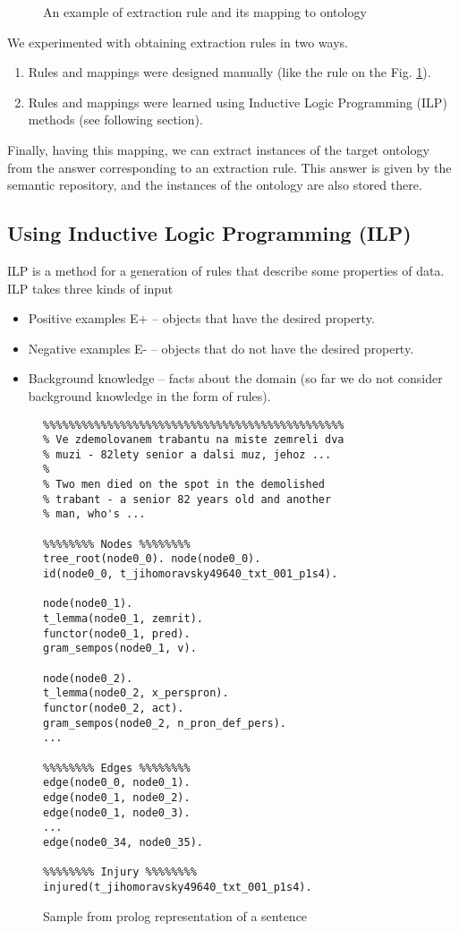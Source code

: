 \documentclass{sig-alternate}
\begin{document}
\begin{figure}
\centering
{}
\caption{An example of extraction rule and its mapping to ontology}
\label{img:ExtractionOntology}
\end{figure}

We experimented with obtaining extraction rules in two ways.
\begin{enumerate}
\item Rules and mappings were designed manually (like the rule on the Fig. \ref{img:ExtractionOntology}). 
\item Rules and mappings were learned using Inductive Logic Programming (ILP) methods (see following section).
\end{enumerate}
 Finally, having this mapping, we can extract instances of the target ontology from the answer corresponding to an extraction rule. This answer is given by the semantic repository, and the instances of the ontology are also stored there.

\subsection{Using Inductive Logic Programming (ILP)}
ILP \cite{biblio:Muggleton} is a method for a generation of rules that describe some properties of data. ILP takes three kinds of input
\begin{itemize}
	\item Positive examples E+ -- objects that have the desired property.
	\item Negative examples E- -- objects that do not have the desired property.
	\item Background knowledge -- facts about the domain (so far we do not consider background knowledge in the form of rules).
\end{itemize}

\begin{figure}
{\footnotesize\begin{verbatim}
%%%%%%%%%%%%%%%%%%%%%%%%%%%%%%%%%%%%%%%%%%%%%%%
% Ve zdemolovanem trabantu na miste zemreli dva
% muzi - 82lety senior a dalsi muz, jehoz ...
%
% Two men died on the spot in the demolished 
% trabant - a senior 82 years old and another 
% man, who's ...

%%%%%%%% Nodes %%%%%%%%
tree_root(node0_0). node(node0_0). 
id(node0_0, t_jihomoravsky49640_txt_001_p1s4).

node(node0_1).
t_lemma(node0_1, zemrit).
functor(node0_1, pred).
gram_sempos(node0_1, v). 

node(node0_2).
t_lemma(node0_2, x_perspron).
functor(node0_2, act).
gram_sempos(node0_2, n_pron_def_pers).
...

%%%%%%%% Edges %%%%%%%%
edge(node0_0, node0_1). 
edge(node0_1, node0_2). 
edge(node0_1, node0_3). 
... 
edge(node0_34, node0_35).

%%%%%%%% Injury %%%%%%%%
injured(t_jihomoravsky49640_txt_001_p1s4).

\end{verbatim}}
\caption{Sample from prolog representation of a sentence }
\label{img:prologFacts}
\end{figure}
\end{document}
